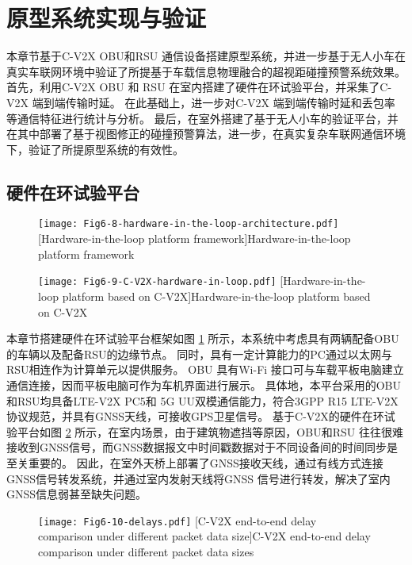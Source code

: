 \section{原型系统实现与验证}\label{section 6-5}

本章节基于C-V2X OBU和RSU 通信设备搭建原型系统，并进一步基于无人小车在真实车联网环境中验证了所提基于车载信息物理融合的超视距碰撞预警系统效果。
首先，利用C-V2X OBU 和 RSU 在室内搭建了硬件在环试验平台，并采集了C-V2X 端到端传输时延。
在此基础上，进一步对C-V2X 端到端传输时延和丢包率等通信特征进行统计与分析。
最后，在室外搭建了基于无人小车的验证平台，并在其中部署了基于视图修正的碰撞预警算法，进一步，在真实复杂车联网通信环境下，验证了所提原型系统的有效性。

\subsection{硬件在环试验平台}

\begin{figure}[h]
\centering
  \texttt{[image: Fig6-8-hardware-in-the-loop-architecture.pdf]}
  [Hardware-in-the-loop platform framework]{Hardware-in-the-loop platform framework}
  \label{fig 6-8}
\end{figure}

\begin{figure}[h]
\centering
  \texttt{[image: Fig6-9-C-V2X-hardware-in-loop.pdf]}
  [Hardware-in-the-loop platform based on C-V2X]{Hardware-in-the-loop platform based on C-V2X}
  \label{fig 6-9}
\end{figure}

本章节搭建硬件在环试验平台框架如图 \ref{fig 6-8} 所示，本系统中考虑具有两辆配备OBU的车辆以及配备RSU的边缘节点。
同时，具有一定计算能力的PC通过以太网与RSU相连作为计算单元以提供服务。
OBU 具有Wi-Fi 接口可与车载平板电脑建立通信连接，因而平板电脑可作为车机界面进行展示。
具体地，本平台采用的OBU和RSU均具备LTE-V2X PC5和 5G UU双模通信能力，符合3GPP R15 LTE-V2X协议规范，并具有GNSS天线，可接收GPS卫星信号。
基于C-V2X的硬件在环试验平台如图 \ref{fig 6-9} 所示，在室内场景，由于建筑物遮挡等原因，OBU和RSU 往往很难接收到GNSS信号，而GNSS数据报文中时间戳数据对于不同设备间的时间同步是至关重要的。
因此，在室外天桥上部署了GNSS接收天线，通过有线方式连接GNSS信号转发系统，并通过室内发射天线将GNSS 信号进行转发，解决了室内GNSS信息弱甚至缺失问题。

\begin{figure}[h]
\centering
  \texttt{[image: Fig6-10-delays.pdf]}
  [C-V2X end-to-end delay comparison under different packet data size]{C-V2X end-to-end delay comparison under different packet data sizes}
  \label{fig 6-10}
\end{figure}

